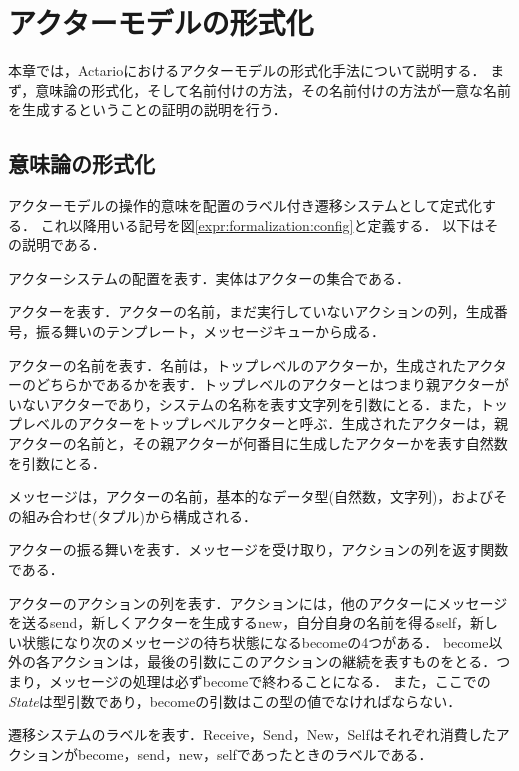 \chapter{アクターモデルの形式化}
\label{chapter:formalization}

本章では，Actarioにおけるアクターモデルの形式化手法について説明する．
まず，意味論の形式化，そして名前付けの方法，その名前付けの方法が一意な名前を生成するということの証明の説明を行う．


\section{意味論の形式化}

アクターモデルの操作的意味を配置のラベル付き遷移システムとして定式化する．
これ以降用いる記号を図\ref{expr:formalization:config}と定義する．
以下はその説明である．

\begin{description}[style=nextline,leftmargin=12pt,parsep=0pt]
\item[\textit{Configuration}]
  アクターシステムの配置を表す．実体はアクターの集合である．
\item[\textit{Actor}]
  アクターを表す．アクターの名前，まだ実行していないアクションの列，生成番号，振る舞いのテンプレート，メッセージキューから成る．
\item[\textit{Name}]
  アクターの名前を表す．名前は，トップレベルのアクターか，生成されたアクターのどちらかであるかを表す．トップレベルのアクターとはつまり親アクターがいないアクターであり，システムの名称を表す文字列を引数にとる．また，トップレベルのアクターをトップレベルアクターと呼ぶ．生成されたアクターは，親アクターの名前と，その親アクターが何番目に生成したアクターかを表す自然数を引数にとる．
\item[\textit{Message}]
  メッセージは，アクターの名前，基本的なデータ型(自然数，文字列)，およびその組み合わせ(タプル)から構成される．
\item[\textit{Behavior State}]
  アクターの振る舞いを表す．メッセージを受け取り，アクションの列を返す関数である．
\item[\textit{Actions State}]
  アクターのアクションの列を表す．アクションには，他のアクターにメッセージを送る\textsf{send}，新しくアクターを生成する\textsf{new}，自分自身の名前を得る\textsf{self}，新しい状態になり次のメッセージの待ち状態になる\textsf{become}の4つがある．
  \textsf{become}以外の各アクションは，最後の引数にこのアクションの継続を表すものをとる．つまり，メッセージの処理は必ず\textsf{become}で終わることになる．
  また，ここでの\textit{State}は型引数であり，\textsf{become}の引数はこの型の値でなければならない．
\item[\textit{Label}]
  遷移システムのラベルを表す．\textsf{Receive}，\textsf{Send}，\textsf{New}，\textsf{Self}はそれぞれ消費したアクションが\textsf{become}，\textsf{send}，\textsf{new}，\textsf{self}であったときのラベルである．
\end{description}


